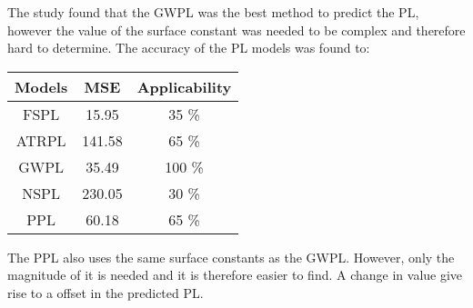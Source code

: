 \large



The study found that the GWPL was the best method to predict the PL, however the value of the surface constant was needed to be complex and therefore hard to determine. The accuracy of the PL models was found to:

\begin{center}
\begin{tabular}{|c|c|c|}
\hline
\rowcolor{white}
\textbf{Models} & \textbf{MSE} & \textbf{Applicability} \\ \hline \rowcolor{white}
FSPL            & 15.95        & 35 \%                  \\ \hline \rowcolor{white}
ATRPL 		    & 141.58       & 65 \%                  \\ \hline \rowcolor{white} %
GWPL            & 35.49        & 100 \%                 \\ \hline \rowcolor{white}
NSPL            & 230.05       & 30 \%                  \\ \hline \rowcolor{white}
PPL            & 60.18        & 65 \%                  \\ \hline
\end{tabular}
\end{center}


The PPL also uses the same surface constants as the GWPL. However, only the magnitude of it is needed and it is therefore easier to find. A change in value give rise to a offset in the predicted PL.

